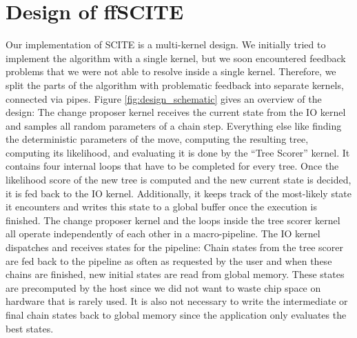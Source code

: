 \chapter{Design of ffSCITE}
\label{ch:design}

Our implementation of \ac{SCITE} is a multi-kernel design. We initially tried to implement the algorithm with a single kernel, but we soon encountered feedback problems that we were not able to resolve inside a single kernel. Therefore, we split the parts of the algorithm with problematic feedback into separate kernels, connected via pipes. Figure \ref{fig:design_schematic} gives an overview of the design: The change proposer kernel receives the current state from the IO kernel and samples all random parameters of a chain step. Everything else like finding the deterministic parameters of the move, computing the resulting tree, computing its likelihood, and evaluating it is done by the ``Tree Scorer'' kernel. It contains four internal loops that have to be completed for every tree. Once the likelihood score of the new tree is computed and the new current state is decided, it is fed back to the IO kernel. Additionally, it keeps track of the most-likely state it encounters and writes this state to a global buffer once the execution is finished. The change proposer kernel and the loops inside the tree scorer kernel all operate independently of each other in a macro-pipeline. The IO kernel dispatches and receives states for the pipeline: Chain states from the tree scorer are fed back to the pipeline as often as requested by the user and when these chains are finished, new initial states are read from global memory. These states are precomputed by the host since we did not want to waste chip space on hardware that is rarely used. It is also not necessary to write the intermediate or final chain states back to global memory since the application only evaluates the best states.


